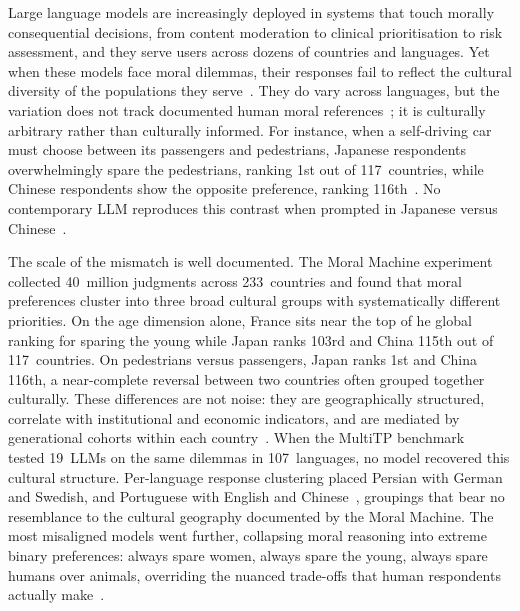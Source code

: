 \documentclass{article}
\begin{document}
Large language models are increasingly deployed in systems that touch morally consequential decisions, from content moderation to clinical prioritisation to risk assessment, and they serve users across dozens of countries and languages. Yet when these models face moral dilemmas, their responses fail to reflect the cultural diversity of the populations they serve~\citep{jin2025multitp}. They do vary across languages, but the variation does not track documented human moral references~\citep{awad2018moral}; it is culturally arbitrary rather than culturally informed. For instance, when a self-driving car must choose between its passengers and pedestrians, Japanese respondents overwhelmingly spare the pedestrians, ranking 1st out of 117~countries, while Chinese respondents show the opposite preference, ranking 116th~\citep{awad2018moral}. No contemporary LLM reproduces this contrast when prompted in Japanese versus Chinese~\citep{jin2025multitp}.

The scale of the mismatch is well documented. The Moral Machine experiment~\citep{awad2018moral} collected 40~million judgments across 233~countries and found that moral preferences cluster into three broad cultural groups with systematically different priorities. On the age dimension alone, France sits near the top of he global ranking for sparing the young while Japan ranks 103rd and China 115th out of 117~countries. On pedestrians versus passengers, Japan ranks 1st and China 116th, a near-complete reversal between two countries often grouped together culturally. These differences are not noise: they are geographically structured, correlate with institutional and economic indicators, and are mediated by generational cohorts within each country~\citep{awad2018moral, inglehart2005modernization}. When the MultiTP benchmark~\citep{jin2025multitp} tested 19~LLMs on the same dilemmas in 107~languages, no model recovered this cultural structure. Per-language response clustering placed Persian with German and Swedish, and Portuguese with English and Chinese~\citep{jin2025multitp}, groupings that bear no resemblance to the cultural geography documented by the Moral Machine. The most misaligned models went further, collapsing moral reasoning into extreme binary preferences: always spare women, always spare the young, always spare humans over animals, overriding the nuanced trade-offs that human respondents actually make~\citep{jin2025multitp}.
\end{document}
